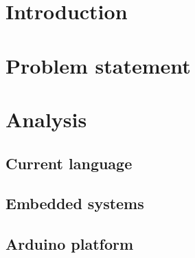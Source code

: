 


\frontmatter %
\newcommand{\ind}[1]{}

\ind{FormaliaForside}
\cleardoublepage %

\ind{FormaliaTitelblad}
\cleardoublepage
\ind{FormaliaProlog.tex}
\ind{FormaliaUnderskriftsside.tex}
\cleardoublepage



\setlength\parskip{0ex} %
\tableofcontents* %
\setlength{\parskip}{3mm} %



\label{marker}
\mainmatter

\pagestyle{custom}

\chapter{Introduction}
\ind{FormaliaIndledning}
\renewcommand{\ind}[1]{}
\chapter{Problem statement}
\chapter{Analysis}
	\section{Current language}
	\section{Embedded systems}
	\section{Arduino platform}

